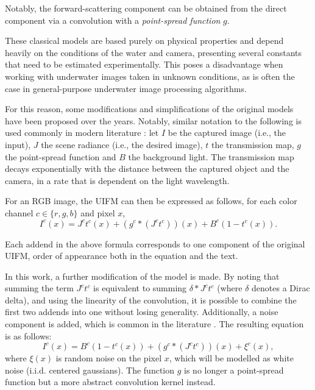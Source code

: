 \documentclass[twocolumn,twoside,a4paper,10pt]{IEEEtran}
\begin{document}
Notably, the forward-scattering component can be obtained from the direct component via a convolution with a \textit{point-spread function} \(g\).

These classical models are based purely on physical properties and depend heavily on the
conditions of the water and camera, presenting several constants that need to be
estimated experimentally. This poses a disadvantage when working with
underwater images taken in unknown conditions, as is often the case in
general-purpose underwater image processing algorithms.

For this reason, some modifications and simplifications of the original models
have been proposed over the years. Notably, similar notation to the following is used commonly in modern literature \cite{xie2021variational,ancuti2017color}: let \(I\) be the captured image (i.e., the input), \(J\) the scene radiance (i.e., the desired image), \(t\) the transmission map, \(g\) the point-spread function and \(B\) the background light. The transmission map decays exponentially with the distance between the captured object and the camera, in a rate that is dependent on the light wavelength.

For an RGB image, the UIFM can then be expressed as follows, for each color channel \(c\in\{r, g, b\}\) and pixel \(x\),
\begin{equation}\label{eq:uifm}
  I^c(x) = J^ct^c(x) + \left(g^c\ast\left(J^c t^c\right)\right) (x) +  B^c\left(1 - t^c(x)\right).
\end{equation}

Each addend in the above formula corresponds to one component of the original UIFM, order of appearance both in the equation and the text.

In this work, a further modification of the model is made. By noting that summing the term \(J^ct^c\) is equivalent to summing \(\delta\ast J^ct^c\) (where \(\delta\) denotes a Dirac delta), and using the linearity of the convolution, it is possible to combine the first two addends into one without 
losing generality. Additionally, a noise component is added, which is common in the literature \cite{xie2021variational}. The resulting equation is as follows:
\begin{equation}\label{eq:physical-model}
  I^c(x) = B^c\left(1 - t^c(x)\right) + \left(g^c\ast\left(J^c t^c\right)\right) (x) + \xi^c(x),
\end{equation}
where \(\xi(x)\) is random noise on the pixel \(x\), which will be modelled as white noise (i.i.d. centered gaussians). The function \(g\) is no longer a point-spread function but a more abstract convolution kernel instead.
\end{document}
